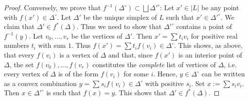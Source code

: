 \documentclass{amsart}
\theoremstyle{definition}
\theoremstyle{remark}
\begin{document}
\begin{proof}
Conversely, we prove that $f^{-1} (\Delta^\circ) \subset \bigsqcup \Delta'^\circ$:
Let $x'\in |L|$ be any point with $f(x') \in \Delta^\circ$.
Let $\Delta'$ be the unique simplex of $L$ such that
$x' \in \Delta'^\circ$.
We claim that $\Delta' \in f^* (\Delta)$.
Thus we need to show that $\Delta'^\circ$ contains a point of $f^{-1}(y)$.
Let $v_0,\ldots, v_r$ be the vertices of $\Delta'$.
Then $x' = \sum t_i v_i$
for positive real numbers $t_i$ with sum $1$.
Thus
$f(x') = \sum t_i f(v_i) \in \Delta^\circ.$
This shows, as above, that every $f(v_i)$ is a vertex of $\Delta$ and that,
since $f(x')$ is an interior point of $\Delta$, the set
$f(v_0),\ldots, f(v_r)$ constitutes the \emph{complete} list of
vertices of $\Delta$, i.e. every vertex of $\Delta$ is of the
form $f(v_i)$ for some $i$.
Hence, $y \in \Delta^\circ$ can be written as a convex combination
$y = \sum s_i f(v_i) \in \Delta^\circ$
with positive $s_i$.
Set 
$x := \sum s_i v_i.$
Then $x\in \Delta'^\circ$ is such that $f(x) =y$.
This shows that $\Delta' \in f^* (\Delta)$.
\end{proof}
\end{document}

